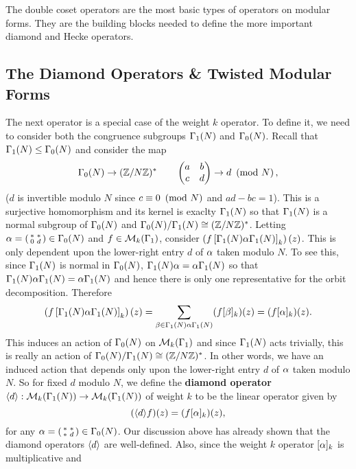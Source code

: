       The double coset operators are the most basic types of operators on modular forms. They are the building blocks needed to define the more important diamond and Hecke operators.
    \subsection*{The Diamond Operators \& Twisted Modular Forms}
      The next operator is a special case of the weight $k$ operator. To define it, we need to consider both the congruence subgroups $\Gamma_{1}(N)$ and $\Gamma_{0}(N)$. Recall that $\Gamma_{1}(N) \le \Gamma_{0}(N)$ and consider the map
      \[
        \Gamma_{0}(N) \to (\mathbb{Z}/N\mathbb{Z})^{\ast} \qquad \begin{pmatrix} a & b \\ c & d\end{pmatrix} \to d \ \left(\text{mod }N\right),
      \]
      ($d$ is invertible modulo $N$ since $c \equiv 0 \ \left(\text{mod }N\right)$ and $ad-bc = 1$). This is a surjective homomorphism and its kernel is exaclty $\Gamma_{1}(N)$ so that $\Gamma_{1}(N)$ is a normal subgroup of $\Gamma_{0}(N)$ and $\Gamma_{0}(N)/\Gamma_{1}(N) \cong (\mathbb{Z}/N\mathbb{Z})^{\ast}$. Letting $\alpha = \begin{psmallmatrix} \ast & \ast \\ 0 & d \end{psmallmatrix} \in \Gamma_{0}(N)$ and $f \in \mathcal{M}_{k}(\Gamma_{1})$, consider $\left(f\left[\Gamma_{1}(N)\alpha\Gamma_{1}(N)\right]_{k}\right)(z)$. This is only dependent upon the lower-right entry $d$ of $\alpha$ taken modulo $N$. To see this, since $\Gamma_{1}(N)$ is normal in $\Gamma_{0}(N)$, $\Gamma_{1}(N)\alpha = \alpha\Gamma_{1}(N)$ so that $\Gamma_{1}(N)\alpha\Gamma_{1}(N) = \alpha\Gamma_{1}(N)$ and hence there is only one representative for the orbit decomposition. Therefore
      \[
        \left(f\left[\Gamma_{1}(N)\alpha\Gamma_{1}(N)\right]_{k}\right)(z) = \sum_{\beta \in \Gamma_{1}(N)\alpha\Gamma_{1}(N)}(f[\beta]_{k})(z) = (f[\alpha]_{k})(z).
      \]
      This induces an action of $\Gamma_{0}(N)$ on $\mathcal{M}_{k}(\Gamma_{1})$ and since $\Gamma_{1}(N)$ acts trivially, this is really an action of $\Gamma_{0}(N)/\Gamma_{1}(N) \cong (\mathbb{Z}/N\mathbb{Z})^{\ast}$. In other words, we have an induced action that depends only upon the lower-right entry $d$ of $\alpha$ taken modulo $N$. So for fixed $d$ modulo $N$, we define the \textbf{diamond operator} $\langle d\rangle:\mathcal{M}_{k}(\Gamma_{1}(N)) \to \mathcal{M}_{k}(\Gamma_{1}(N))$ of weight $k$ to be the linear operator given by
      \[
        (\langle d\rangle f)(z) = (f[\alpha]_{k})(z),
      \]
      for any $\alpha = \begin{psmallmatrix} \ast & \ast \\ \ast & d \end{psmallmatrix} \in \Gamma_{0}(N)$. Our discussion above has already shown that the diamond operators $\langle d\rangle$ are well-defined. Also, since the weight $k$ operator $[\alpha]_{k}$ is multiplicative and
